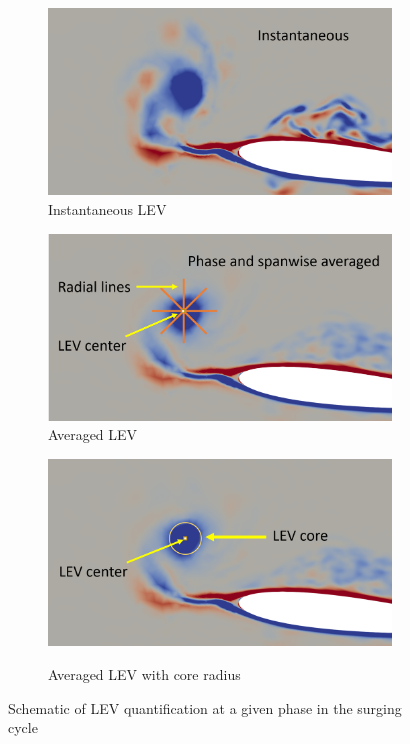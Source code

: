 \begin{figure}[H]
	\begin{subfigure}{0.5\textwidth}
		\includegraphics[width=1\textwidth]{figures/adapt_strat/LEV_tracking1.png}
		\caption{Instantaneous LEV}
		\label{fig:LEV_tracking1}
	\end{subfigure}
	\begin{subfigure}{0.5\textwidth}
	\includegraphics[width=1\textwidth]{figures/adapt_strat/LEV_tracking2.png}
	\caption{Averaged LEV}
	\label{fig:LEV_tracking2}
	\end{subfigure}

	\centering
	\begin{subfigure}{0.5\textwidth}
	\includegraphics[width=1\textwidth]{figures/adapt_strat/LEV_tracking3.png}
	\label{fig:LEV_tracking3}
    \caption{Averaged LEV with core radius}
\end{subfigure}
	
	\caption{Schematic of LEV quantification at a given phase in the surging cycle}
	\label{fig:LEV_tracking}
\end{figure}


